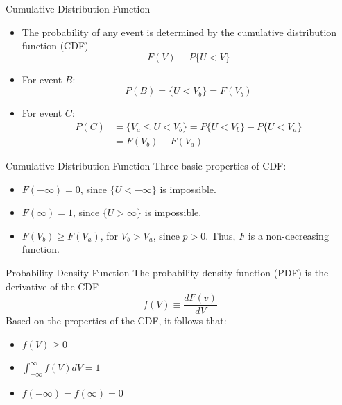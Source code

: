 
\begin{frame}{Cumulative Distribution Function}
\begin{itemize}
  	\item The probability of any event is determined by the cumulative distribution function (CDF)
  	$$F(V) \equiv P\{U<V\}$$
  	\item For event $B$:
  	$$P(B) = \{U < V_b \} = F(V_b)$$
  	\item For event $C$:
  	\begin{align*}
  	P(C) &= \{V_a \leq U < V_b \} = P\{U < V_b \} - P\{U < V_a \}\\ &= F(V_b) - F(V_a)
  	\end{align*}
  \end{itemize}
\end{frame}


\begin{frame}{Cumulative Distribution Function}
Three basic properties of CDF:
\begin{itemize}
  	\item $F(-\infty) = 0$, since $\{U < -\infty\}$ is impossible.
  	\item $F(\infty) = 1$, since $\{U > \infty\}$ is impossible.
  	\item $F(V_b) \geq F(V_a)$, for $V_b > V_a$, since $p > 0$. Thus, $F$ is a non-decreasing function.  
  \end{itemize}
\end{frame}


\begin{frame}{Probability Density Function}
The probability density function (PDF) is the derivative of the CDF
$$f(V)\equiv \frac{d F(v)}{dV}$$
Based on the properties of the CDF, it follows that:
\begin{itemize}
  	\item $f(V) \geq 0$
  	\item $\int^{\infty}_{-\infty} f(V) dV = 1$
  	\item $f(-\infty) = f(\infty) = 0$
  \end{itemize}
\end{frame}


